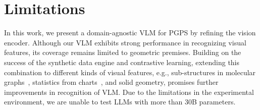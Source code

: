 \section*{Limitations}

In this work, we present a domain-agnostic VLM for PGPS by refining the vision encoder. Although our VLM exhibits strong performance in recognizing visual features, its coverage remains limited to geometric premises.
Building on the success of the synthetic data engine and contrastive learning, extending this combination to different kinds of visual features, e.g., sub-structures in molecular graphs~\citep{molvf}, statistics from charts~\citep{chartqa}, and solid geometry, promises further improvements in recognition of VLM. Due to the limitations in the experimental environment, we are unable to test LLMs with more than 30B parameters.

